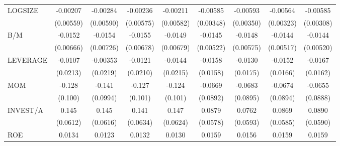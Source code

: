 {\begin{tabular}{l*{8}{c}}
LOGSIZE             &    -0.00207         &    -0.00284         &    -0.00236         &    -0.00211         &    -0.00585\sym{*}  &    -0.00593\sym{*}  &    -0.00564\sym{*}  &    -0.00585\sym{*}  \\
                    &   (0.00559)         &   (0.00590)         &   (0.00575)         &   (0.00582)         &   (0.00348)         &   (0.00350)         &   (0.00323)         &   (0.00308)         \\
B/M                 &     -0.0152\sym{**} &     -0.0154\sym{**} &     -0.0155\sym{**} &     -0.0149\sym{**} &     -0.0145\sym{***}&     -0.0148\sym{**} &     -0.0144\sym{***}&     -0.0144\sym{***}\\
                    &   (0.00666)         &   (0.00726)         &   (0.00678)         &   (0.00679)         &   (0.00522)         &   (0.00575)         &   (0.00517)         &   (0.00520)         \\
LEVERAGE            &     -0.0107         &    -0.00353         &     -0.0121         &     -0.0144         &     -0.0158         &     -0.0130         &     -0.0152         &     -0.0167         \\
                    &    (0.0213)         &    (0.0219)         &    (0.0210)         &    (0.0215)         &    (0.0158)         &    (0.0175)         &    (0.0166)         &    (0.0162)         \\
MOM                 &      -0.128         &      -0.141         &      -0.127         &      -0.124         &     -0.0669         &     -0.0683         &     -0.0674         &     -0.0655         \\
                    &     (0.100)         &    (0.0994)         &     (0.101)         &     (0.101)         &    (0.0892)         &    (0.0895)         &    (0.0894)         &    (0.0888)         \\
INVEST/A            &       0.145\sym{**} &       0.145\sym{**} &       0.141\sym{**} &       0.147\sym{**} &      0.0879         &      0.0762         &      0.0869         &      0.0890         \\
                    &    (0.0612)         &    (0.0616)         &    (0.0634)         &    (0.0624)         &    (0.0578)         &    (0.0593)         &    (0.0585)         &    (0.0590)         \\
ROE                 &      0.0134         &      0.0123         &      0.0132         &      0.0130         &      0.0159         &      0.0156         &      0.0159         &      0.0159         \\

\end{tabular}}

